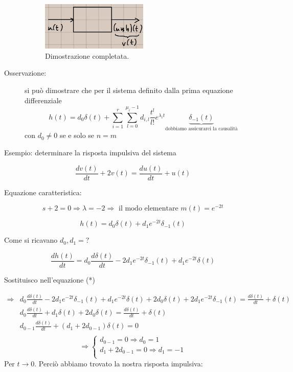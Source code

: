 \documentclass[a4paper, 12pt]{book}
\theoremstyle{plain}
\begin{document}
\begin{description}
\[\begin{split}
    \end{split} \]
    \begin{figure}
        \includegraphics[width=0.5\textwidth]{sistema1.jpg}
        \caption{Dimostrazione completata.}
    \end{figure}
    \item[Osservazione:] si può dimostrare che per il sistema definito dalla prima equazione differenziale \[h(t) = d_0\delta(t) + \sum_{i = 1}^r \sum_{l = 0}^{\mu_i - 1} d_{i,l} \frac{t^l}{l!} e^{\lambda_it} \underbrace{\delta_{-1} (t)}_{\textrm{dobbiamo assicurarci la causalità}}\] con $d_0 \neq 0$ se e solo se $n = m$ 
\end{description}

Esempio: determinare la risposta impulsiva del sistema 

\[
    \frac{dv(t)}{dt} + 2v(t) = \frac{du(t)}{dt} + u(t)
\]

Equazione caratteristica:

\[
    s + 2 = 0 \Rightarrow \lambda = -2 \Rightarrow \textrm{ il modo elementare } m(t) = e^{-2t}
\]

\[
    h(t) = d_0\delta(t) + d_1 e^{-2t} \delta_{-1} (t)
\]

Come si ricavano $d_0, d_1= ?$

\[
    \frac{dh(t)}{dt} = d_0 \frac{d\delta(t)}{dt} -2d_1 e^{-2t} \delta_{-1}(t) + d_1 e^{-2t} \delta(t)
\]

Sostituisco nell'equazione (*)

\[
    \begin{split}
        \Rightarrow &d_0 \frac{d\delta(t)}{dt} - 2d_1 e^{-2t} \delta_{-1}(t) + d_1 e^{-2t} \delta(t) + 2d_0 \delta(t) + 2 d_1 e^{-2t} \delta_{-1}(t) = \frac{d\delta(t)}{dt} +\delta(t) \\
        &d_0 \frac{d\delta(t)}{dt} + d_1 \delta(t) + 2d_0 \delta(t) = \frac{d\delta(t)}{dt} + \delta(t) \\
        &d_{0 - 1} \frac{d\delta(t)}{dt} + (d_1 + 2d_{0 - 1}) \delta(t) = 0 \\
    \end{split}
\]
\[\Rightarrow
\begin{cases}
    d_{0 - 1} = 0 \Rightarrow d_0 = 1\\
    d_1 + 2d_{0 - 1} = 0 \Rightarrow d_1 = -1\\
\end{cases}
\]
Per $t\rightarrow 0$. Perciò abbiamo trovato la nostra risposta impulsiva:
\end{document}
